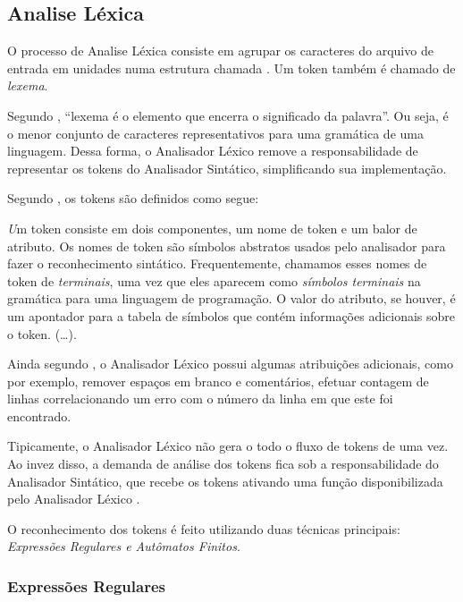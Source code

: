 \subsection{Analise Léxica}

O processo de Analise Léxica consiste em agrupar os caracteres do arquivo de
entrada em unidades numa estrutura chamada \token. Um token também é chamado
de \emph{lexema}.

Segundo , ``lexema é o elemento que encerra o
significado da palavra''. Ou seja, é o menor conjunto de caracteres
representativos para uma gramática de uma linguagem. Dessa forma, o Analisador
Léxico remove a responsabilidade de representar os tokens do Analisador
Sintático, simplificando sua implementação.

Segundo , os tokens são definidos como segue:

\begin{citacao}{4cm}{0cm}\footnotesize \emph
	Um token consiste em dois componentes, um nome de token e um balor de
	atributo. Os nomes de token são símbolos abstratos usados pelo analisador para
	fazer o reconhecimento sintático. Frequentemente, chamamos esses nomes de
	token de \emph{terminais}, uma vez que eles aparecem como \emph{símbolos
	terminais} na gramática para uma linguagem de programação. O valor do
	atributo, se houver, é um apontador para a tabela de símbolos que contém
	informações adicionais sobre o token. (\ldots).
\end{citacao}

Ainda segundo , o Analisador Léxico possui algumas
atribuições adicionais, como por exemplo, remover espaços em branco e
comentários, efetuar contagem de linhas correlacionando um erro com o número
da linha em que este foi encontrado.

Tipicamente, o Analisador Léxico não gera o todo o fluxo de tokens de uma vez.
Ao invez disso, a demanda de análise dos tokens fica sob a responsabilidade do
Analisador Sintático, que recebe os tokens ativando uma função disponibilizada
pelo Analisador Léxico \cite{louden97-pt}.

O reconhecimento dos tokens é feito utilizando duas técnicas principais:
\emph{Expressões Regulares e Autômatos Finitos}.

\subsubsection{Expressões Regulares}

